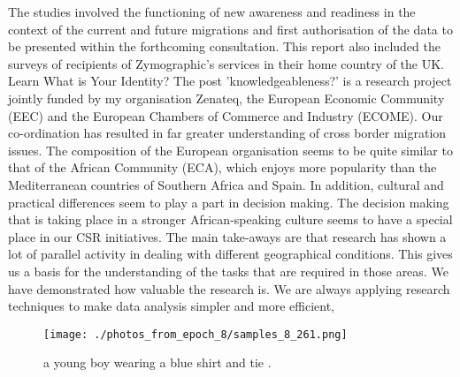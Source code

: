 \documentclass{article}%
\begin{document}
The studies involved the functioning of new awareness and readiness in the context of the current and future migrations and first authorisation of the data to be presented within the forthcoming consultation.\newline%
This report also included the surveys of recipients of Zymographic's services in their home country of the UK.\newline%
Learn What is Your Identity?\newline%
The post 'knowledgeableness?' is a research project jointly funded by my organisation Zenateq, the European Economic Community (EEC) and the European Chambers of Commerce and Industry (ECOME). Our co{-}ordination has resulted in far greater understanding of cross border migration issues.\newline%
The composition of the European organisation seems to be quite similar to that of the African Community (ECA), which enjoys more popularity than the Mediterranean countries of Southern Africa and Spain. In addition, cultural and practical differences seem to play a part in decision making. The decision making that is taking place in a stronger African{-}speaking culture seems to have a special place in our CSR initiatives.\newline%
The main take{-}aways are that research has shown a lot of parallel activity in dealing with different geographical conditions. This gives us a basis for the understanding of the tasks that are required in those areas. We have demonstrated how valuable the research is.\newline%
We are always applying research techniques to make data analysis simpler and more efficient,\newline%

%


\begin{figure}[h!]%
\centering%
\texttt{[image: ./photos\_from\_epoch\_8/samples\_8\_261.png]}%
\caption{a young boy wearing a blue shirt and tie .}%
\end{figure}

%
\end{document}
